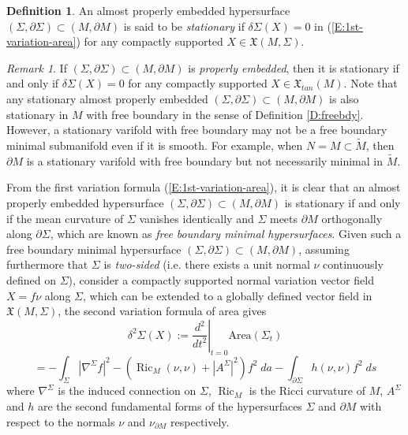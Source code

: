 \documentclass[10pt]{amsart}
\theoremstyle{definition}
\newtheorem{definition}[theorem]{Definition}
\theoremstyle{remark}
\newtheorem{remark}[theorem]{Remark}
\numberwithin{equation}{section}
\newcommand{\tM}{\widetilde{M}}
\newcommand{\Ric}{\operatorname{Ric}}
\begin{document}
\begin{definition}
\label{D:stationary}
An almost properly embedded hypersurface $(\Sigma,\partial \Sigma) \subset (M,\partial M)$ is said to be \emph{stationary} if $\delta \Sigma(X)=0$ in (\ref{E:1st-variation-area}) for any compactly supported $X\in \mathfrak{X}(M,\Sigma)$. 
\end{definition}

\begin{remark}
If $(\Sigma,\partial \Sigma) \subset (M,\partial M)$ is \emph{properly embedded}, then it is stationary if and only if $\delta \Sigma(X) =0$ for any compactly supported $X \in \mathfrak{X}_{tan}(M)$. 
Note that any stationary almost properly embedded $(\Sigma,\partial \Sigma) \subset (M,\partial M)$ is also stationary in $M$ with free boundary in the sense of Definition \ref{D:freebdy}. However, a stationary varifold with free boundary may not be a free boundary minimal submanifold even if it is smooth. For example, when $N=M \subset \tM$, then $\partial M$ is a stationary varifold with free boundary but not necessarily minimal in $\tM$. 
\end{remark}

From the first variation formula (\ref{E:1st-variation-area}), it is clear that an almost properly embedded hypersurface $(\Sigma,\partial \Sigma) \subset (M,\partial M)$ is stationary if and only if the mean curvature of $\Sigma$ vanishes identically and $\Sigma$ meets $\partial M$ orthogonally along $\partial \Sigma$, which are known as \emph{free boundary minimal hypersurfaces}. Given such a free boundary minimal hypersurface $(\Sigma,\partial \Sigma) \subset (M,\partial M)$, assuming furthermore that $\Sigma$ is \emph{two-sided} (i.e. there exists a unit normal $\nu$ continuously defined on $\Sigma$), consider a compactly supported normal variation vector field $X=f \nu $ along $\Sigma$, which can be extended to a globally defined vector field in $\mathfrak{X}(M,\Sigma)$, the second variation formula of area gives
\begin{equation}
\label{E:2nd-variation-area}
\delta^2 \Sigma(X) := \left. \frac{d^2}{dt^2} \right|_{t=0} \textrm{Area}(\Sigma_t) 
\end{equation}
\[ =-\int_\Sigma |\nabla^\Sigma f|^2 -(\Ric_M(\nu,\nu)+|A^\Sigma|^2)f^2 \; da - \int_{\partial \Sigma} h(\nu,\nu) f^2 \; ds \]
where $\nabla^\Sigma$ is the induced connection on $\Sigma$, $\Ric_M$ is the Ricci curvature of $M$, $A^\Sigma$ and $h$ are the second fundamental forms of the hypersurfaces $\Sigma$ and $\partial M$ with respect to the normals $\nu$ and $\nu_{\partial M}$ respectively.
\end{document}
